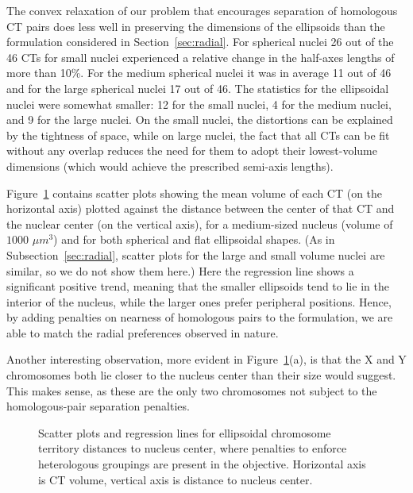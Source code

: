 \documentclass{siamltex}
\begin{document}
The convex relaxation of our problem that encourages separation of
homologous CT pairs does less well in preserving the dimensions of the
ellipsoids than the formulation considered in
Section~\ref{sec:radial}.  For spherical nuclei 26 out of the 46 CTs
for small nuclei experienced a relative change in the half-axes
lengths of more than 10\%. For the medium spherical nuclei it was in
average 11 out of 46 and for the large spherical nuclei 17 out of
46. The statistics for the ellipsoidal nuclei were somewhat smaller:
12 for the small nuclei, 4 for the medium nuclei, and 9 for the large
nuclei.  On the small nuclei, the distortions can be explained by the
tightness of space, while on large nuclei, the fact that all CTs can
be fit without any overlap reduces the need for them to adopt their
lowest-volume dimensions (which would achieve the prescribed semi-axis
lengths).

Figure~\ref{boxplot_medium_ellipsoids_heterologous} contains scatter
plots showing the mean volume of each CT (on the horizontal axis)
plotted against the distance between the center of that CT and the
nuclear center (on the vertical axis), for a medium-sized nucleus
(volume of $1000$ $\mu m^3$) and for both spherical and flat
ellipsoidal shapes.  (As in Subsection~\ref{sec:radial}, scatter plots
for the large and small volume nuclei are similar, so we do not show
them here.) Here the regression line shows a significant positive
trend, meaning that the smaller ellipsoids tend to lie in the interior
of the nucleus, while the larger ones prefer peripheral positions.
Hence, by adding penalties on nearness of homologous pairs to the
formulation, we are able to match the radial preferences observed in
nature.

Another interesting observation, more evident in
Figure~\ref{boxplot_medium_ellipsoids_heterologous}(a), is that the X
and Y chromosomes both lie closer to the nucleus center than their size
would suggest.  This makes sense, as these are the only two
chromosomes not subject to the homologous-pair separation penalties.

\begin{figure}[!t]
\centering
{} \;
\caption{Scatter plots and regression lines for ellipsoidal chromosome
  territory distances to nucleus center, where penalties to enforce
  heterologous groupings are present in the objective.  Horizontal
  axis is CT volume, vertical axis is distance to nucleus center.}
  
  
  
  
\label{boxplot_medium_ellipsoids_heterologous}
\end{figure}
\end{document}
